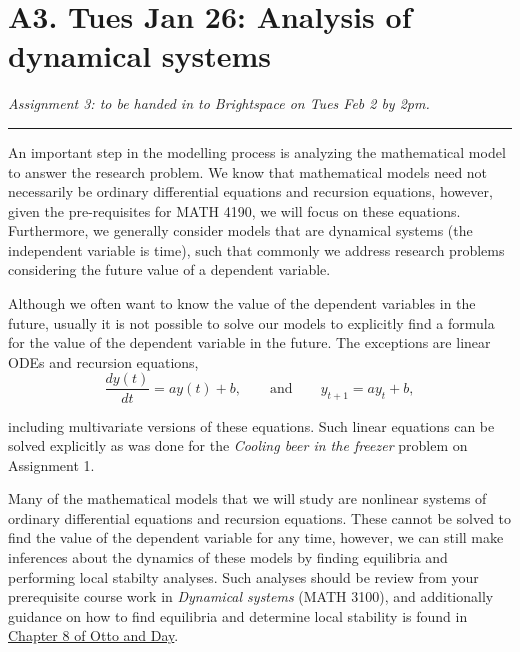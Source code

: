 \documentclass[]{book}
\begin{document}
\chapter{A3. Tues Jan 26: Analysis of dynamical
systems}\label{a3.-tues-jan-26-analysis-of-dynamical-systems}

\emph{Assignment 3: to be handed in to Brightspace on Tues Feb 2 by
2pm.}

\begin{center}\rule{0.5\linewidth}{0.5pt}\end{center}

An important step in the modelling process is analyzing the mathematical
model to answer the research problem. We know that mathematical models
need not necessarily be ordinary differential equations and recursion
equations, however, given the pre-requisites for MATH 4190, we will
focus on these equations. Furthermore, we generally consider models that
are dynamical systems (the independent variable is time), such that
commonly we address research problems considering the future value of a
dependent variable.

Although we often want to know the value of the dependent variables in
the future, usually it is not possible to solve our models to explicitly
find a formula for the value of the dependent variable in the future.
The exceptions are linear ODEs and recursion equations,\\

\begin{equation}
\frac{dy(t)}{dt} = a y(t) + b, \qquad \mbox{and} \qquad y_{t+1} = a y_t + b,
\end{equation}

including multivariate versions of these equations. Such linear
equations can be solved explicitly as was done for the \emph{Cooling
beer in the freezer} problem on Assignment 1.

Many of the mathematical models that we will study are nonlinear systems
of ordinary differential equations and recursion equations. These cannot
be solved to find the value of the dependent variable for any time,
however, we can still make inferences about the dynamics of these models
by finding equilibria and performing local stabilty analyses. Such
analyses should be review from your prerequisite course work in
\emph{Dynamical systems} (MATH 3100), and additionally guidance on how
to find equilibria and determine local stability is found in
\href{https://ebookcentral-proquest-com.qe2a-proxy.mun.ca/lib/mun/reader.action?docID=768551\&ppg=326}{Chapter
8 of Otto and Day}.
\end{document}
